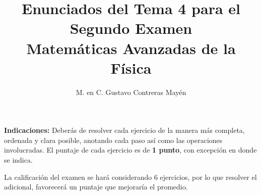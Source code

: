 
\title{Enunciados del Tema 4 para el Segundo Examen \\[0.3em]  \large{Matemáticas Avanzadas de la Física}\vspace{-3ex}}
\author{M. en C. Gustavo Contreras Mayén}
\date{ }

\vspace{-4cm}
\maketitle
\fontsize{14}{14}\selectfont

\textbf{Indicaciones: } Deberás de resolver cada ejercicio de la manera más completa, ordenada y clara posible, anotando cada paso así como las operaciones involucradas. El puntaje de cada ejercicio es de \textbf{1 punto}, con excepción en donde se indica.
\par
La calificación del examen se hará considerando 6 ejercicios, por lo que resolver el adicional, favorecerá un puntaje que mejoraría el promedio.

